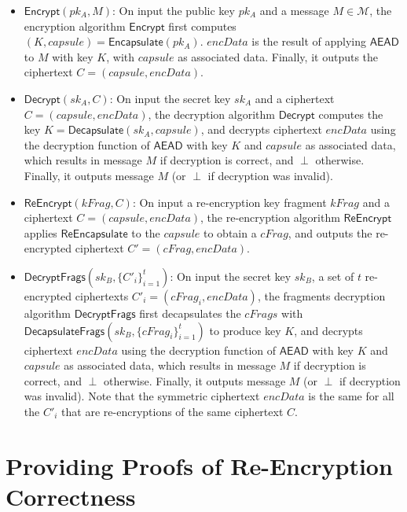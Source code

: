 \documentclass{amsart}
\begin{document}
\begin{itemize}
	
	\item $\mathsf{Encrypt}(pk_A, M)$: On input the public key $pk_A$ and a message $M\in\mathcal{M}$, the encryption algorithm $\mathsf{Encrypt}$ first computes $(K, capsule) = \mathsf{Encapsulate}(pk_A)$. 
	$encData$ is the result of applying $\mathsf{AEAD}$ to $M$ with key $K$, with $capsule$ as associated data. 
	Finally, it outputs the ciphertext $C = (capsule, encData)$.
	
	\item $\mathsf{Decrypt}(sk_A, C)$: On input the secret key $sk_A$ and a ciphertext $C = (capsule, encData)$, the decryption algorithm $\mathsf{Decrypt}$ computes the key $K = \mathsf{Decapsulate}(sk_A, capsule)$, and decrypts ciphertext $encData$ using the decryption function of $\mathsf{AEAD}$ with key $K$ and $capsule$ as associated data, which results in message $M$ if decryption is correct, and $\perp$ otherwise. Finally, it outputs message $M$ (or $\perp$ if decryption was invalid).
	
	\item $\mathsf{ReEncrypt}(kFrag, C)$: On input a re-encryption key fragment $kFrag$ and a ciphertext $C = (capsule, encData)$, the re-encryption algorithm $\mathsf{ReEncrypt}$ applies $\mathsf{ReEncapsulate}$ to the $capsule$ to obtain a $cFrag$, and outputs the re-encrypted ciphertext $C' = (cFrag, encData)$.
	
	\item $\mathsf{DecryptFrags}(sk_B, \{C'_i\}_{i=1}^t)$: On input the secret key $sk_B$, a set of $t$ re-encrypted ciphertexts $C'_i = (cFrag_i, encData)$, the fragments decryption algorithm $\mathsf{DecryptFrags}$ first decapsulates the $cFrags$ with $\mathsf{DecapsulateFrags}(sk_B, \{cFrag_i\}_{i=1}^t)$ to produce key $K$, and decrypts ciphertext $encData$ using the decryption function of $\mathsf{AEAD}$ with key $K$ and $capsule$ as associated data, which results in message $M$ if decryption is correct, and $\perp$ otherwise. Finally, it outputs message $M$ (or $\perp$ if decryption was invalid).	Note that the symmetric ciphertext $encData$ is the same for all the $C'_i$ that are re-encryptions of the same ciphertext $C$. 
	
\end{itemize}
	
\section{Providing Proofs of Re-Encryption Correctness}
\end{document}
